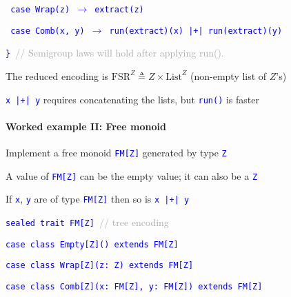 \texttt{\textcolor{blue}{\footnotesize{}  case Wrap(z) $\rightarrow$
extract(z)}}{\footnotesize\par}

\texttt{\textcolor{blue}{\footnotesize{}  case Comb(x, y) $\rightarrow$
run(extract)(x) |+| run(extract)(y)}}{\footnotesize\par}

\texttt{\textcolor{blue}{\footnotesize{}\} }}\textcolor{darkgray}{\footnotesize{}//
Semigroup laws will hold after applying run().}{\footnotesize\par}

The reduced encoding is $\text{FSR}^{Z}\triangleq Z\times\text{List}^{Z}$
(non-empty list of $Z$\textsf{'}s)

\texttt{\textcolor{blue}{\footnotesize{}x |+| y}} requires concatenating
the lists, but \texttt{\textcolor{blue}{\footnotesize{}run()}} is
faster


\paragraph{Worked example II: Free monoid}

Implement a free monoid \texttt{\textcolor{blue}{\footnotesize{}FM{[}Z{]}}}
generated by type \texttt{\textcolor{blue}{\footnotesize{}Z}} 

A value of \texttt{\textcolor{blue}{\footnotesize{}FM{[}Z{]}}} can
be the empty value; it can also be a \texttt{\textcolor{blue}{\footnotesize{}Z}} 

If \texttt{\textcolor{blue}{\footnotesize{}x}}, \texttt{\textcolor{blue}{\footnotesize{}y}}
are of type \texttt{\textcolor{blue}{\footnotesize{}FM{[}Z{]}}} then
so is \texttt{\textcolor{blue}{\footnotesize{}x |+| y}} 

\texttt{\textcolor{blue}{\footnotesize{}sealed trait FM{[}Z{]} }}\textcolor{darkgray}{\footnotesize{}//
tree encoding}{\footnotesize\par}

\texttt{\textcolor{blue}{\footnotesize{}case class Empty{[}Z{]}()
extends FM{[}Z{]}}}{\footnotesize\par}

\texttt{\textcolor{blue}{\footnotesize{}case class Wrap{[}Z{]}(z: Z)
extends FM{[}Z{]}}}{\footnotesize\par}

\texttt{\textcolor{blue}{\footnotesize{}case class Comb{[}Z{]}(x: FM{[}Z{]},
y: FM{[}Z{]}) extends FM{[}Z{]}}}{\footnotesize\par}


